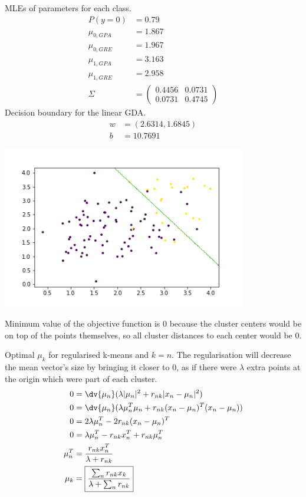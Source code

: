 \documentclass[newpage]{homework}
\begin{document}
\question
MLEs of parameters for each class.
\begin{align*}
    P(y=0)	&=	0.79	\\
    \mu_{0,GPA}   &=  1.867   \\
    \mu_{0,GRE}   &=  1.967   \\
    \mu_{1,GPA}   &=  3.163   \\
    \mu_{1,GRE}   &=  2.958   \\
    \Sigma    &=  \begin{pmatrix}0.4456&0.0731\\0.0731&0.4745\end{pmatrix}
\end{align*}
Decision boundary for the linear GDA.
\begin{align*}
    w	&=	(2.6314, 1.6845)	\\
    b   &=  10.7691
\end{align*}
\begin{center}
    \includegraphics[width=0.8\textwidth]{3b.png}
\end{center}


\question
Minimum value of the objective function is 0 because the cluster centers would be on top of the points themselves, so all cluster distances to each center would be 0.

Optimal $\mu_k$ for regularised k-means and $k=n$. The regularisation will decrease the mean vector's size by bringing it closer to 0, as if there were $\lambda$ extra points at the origin which were part of each cluster.
\begin{align*}
    0   &=  \dv{\mu_n} (\lambda |\mu_n|^2 + r_{nk} |x_n - \mu_n|^2)   \\
    0   &=  \dv{\mu_n} (\lambda \mu_n^T\mu_n + r_{nk} (x_n - \mu_n)^T(x_n-\mu_n)   )    \\
    0   &=  2\lambda \mu_n^T - 2r_{nk} (x_n - \mu_n)^T \\
    0   &=  \lambda \mu_n^T - r_{nk} x_n^T + r_{nk} \mu_n^T \\
    \mu_n^T &=  \frac{r_{nk} x_n^T}{\lambda + r_{nk}} \\
    \mu_k &=  \boxed{\frac{\sum_n r_{nk} x_k}{\lambda + \sum_n r_{nk}}} \\
\end{align*}
\end{document}
